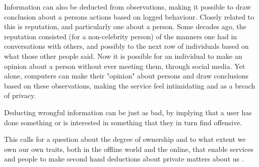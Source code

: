 Information can also be deducted from observations, making it possible
to draw conclusion about a persons actions based on logged behaviour. 
Closely related to this is reputation, and particularly one about a 
person. Some decades ago, the reputation consisted (for a non-celebrity
person) of the manners one had in conversations with others, and 
possibly to the next row of individuals based on what those other people
said. Now it is possible for an individual to make an opinion about a 
person without ever meeting them, through social media. Yet alone,
computers can make their "opinion" about persons and draw conclusions 
based on these observations, making the service feel intimidating and 
as a breach of privacy.

Deducting wrongful information can be just as bad, by implying that 
a user has done something or is interested in something that they in 
turn find offensive.

This calls for a question about the degree of ownership and to what 
extent we own our own traits, both in the offline world and the 
online, that enable services and people to make second hand deductions 
about private matters about us \cite{ethics-of-big-data}.
